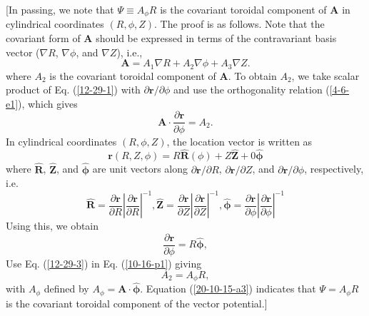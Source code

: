 \documentclass{article}
\newcommand{\tmmathbf}[1]{\ensuremath{\boldsymbol{#1}}}
\begin{document}
[In passing, we note that $\Psi \equiv A_{\phi} R$ is the covariant toroidal
component of $\mathbf{A}$ in cylindrical coordinates $(R, \phi, Z)$. The proof
is as follows. Note that the covariant form of $\mathbf{A}$ should be
expressed in terms of the contravariant basis vector ($\nabla R$, $\nabla
\phi$, and $\nabla Z$), i.e.,
\begin{equation}
  \label{12-29-1} \mathbf{A}= A_1 \nabla R + A_2 \nabla \phi + A_3 \nabla Z.
\end{equation}
where $A_2$ is the covariant toroidal component of $\mathbf{A}$. To obtain
$A_2$, we take scalar product of Eq. (\ref{12-29-1}) with $\partial
\mathbf{r}/ \partial \phi$ and use the orthogonality relation (\ref{4-6-e1}),
which gives
\begin{equation}
  \label{10-16-p1} \mathbf{A} \cdot \frac{\partial \mathbf{r}}{\partial \phi}
  = A_2 .
\end{equation}
In cylindrical coordinates $(R, \phi, Z)$, the location vector is written as
\begin{equation}
  \mathbf{r} (R, Z, \phi) = R \hat{\mathbf{R}} (\phi) + Z \hat{\mathbf{Z}} + 0
  \hat{\tmmathbf{\phi}}
\end{equation}
where $\hat{\mathbf{R}}$, $\hat{\mathbf{Z}}$, and $\hat{\tmmathbf{\phi}}$ are
unit vectors along $\partial \mathbf{r}/ \partial R$, $\partial \mathbf{r}/
\partial Z$, and $\partial \mathbf{r}/ \partial \phi$, respectively, i.e.
\begin{equation}
  \hat{\mathbf{R}} = \frac{\partial \mathbf{r}}{\partial R} \left|
  \frac{\partial \mathbf{r}}{\partial R} \right|^{- 1}, \hat{\mathbf{Z}} =
  \frac{\partial \mathbf{r}}{\partial Z} \left| \frac{\partial
  \mathbf{r}}{\partial Z} \right|^{- 1}, \hat{\tmmathbf{\phi}} =
  \frac{\partial \mathbf{r}}{\partial \phi} \left| \frac{\partial
  \mathbf{r}}{\partial \phi} \right|^{- 1}
\end{equation}
Using this, we obtain
\begin{equation}
  \label{12-29-3} \frac{\partial \mathbf{r}}{\partial \phi} = R
  \hat{\tmmathbf{\phi}},
\end{equation}
Use Eq. (\ref{12-29-3}) in Eq. (\ref{10-16-p1}) giving
\begin{equation}
  \label{20-10-15-a3} A_2 = A_{\phi} R,
\end{equation}
with $A_{\phi}$ defined by $A_{\phi} =\mathbf{A} \cdot \hat{\tmmathbf{\phi}}$.
Equation (\ref{20-10-15-a3}) indicates that $\Psi = A_{\phi} R$ is the
covariant toroidal component of the vector potential.]
\end{document}
